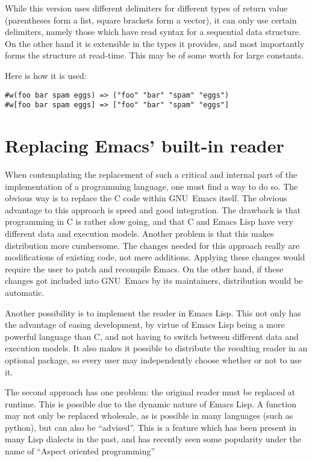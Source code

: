 \documentclass[a4paper,10pt,twoside]{article}
\newcommand{\el}{Emacs Lisp}
\newcommand{\emacs}{GNU~Emacs}
\begin{document}
While this version uses different delimiters for different types of return value
(parentheses form a list, square brackets form a vector), it can only use
certain delimiters, namely those which have read syntax for a sequential data
structure.  On the other hand it is extensible in the types it provides, and
most importantly forms the structure at read-time.  This may be of some worth
for large constants.

Here is how it is used:

\begin{lstlisting}[style=rubyinline]
#w(foo bar spam eggs) => ("foo" "bar" "spam" "eggs")
#w[foo bar spam eggs] => ["foo" "bar" "spam" "eggs"]
\end{lstlisting}

\section{Replacing Emacs’ built-in reader}
\label{sec:repl-reader}

When contemplating the replacement of such a critical and internal part of the
implementation of a programming language, one must find a way to do so.  The
obvious way is to replace the C code within \emacs{} itself.  The obvious
advantage to this approach is speed and good integration.  The drawback is that
programming in C is rather slow going, and that C and \el{} have very different
data and execution models.  Another problem is that this makes distribution more
cumbersome.  The changes needed for this approach really are modifications of
existing code, not mere additions.  Applying these changes would require the
user to patch and recompile Emacs.  On the other hand, if these changes got
included into \emacs{} by its maintainers, distribution would be automatic.

Another possibility is to implement the reader in \el.  This not only has the
advantage of easing development, by virtue of \el{} being a more powerful
language than C, and not having to switch between different data and execution
models.  It also makes it possible to distribute the resulting reader in an
optional package, so every user may independently choose whether or not to use
it.

The second approach has one problem: the original reader must be replaced at
runtime.  This is possible due to the dynamic nature of \el.  A function may not
only be replaced wholesale, as is possible in many languages (such as python),
but can also be ``advised''.  This is a feature which has been present in many
Lisp dialects in the past, and has recently seen some popularity under the name
of ``Aspect oriented programming''
\end{document}
